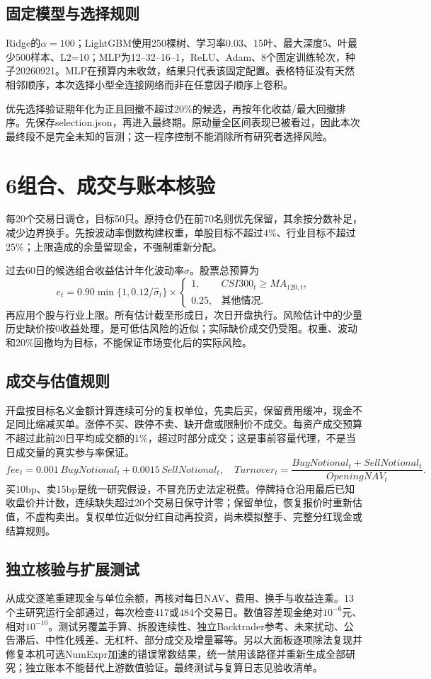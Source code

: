 \documentclass[UTF8,a4paper,10pt]{ctexart}
\newcommand{\lead}[1]{\noindent{\bfseries\color{accent}#1}\par}
\newcommand{\page}[1]{\newpage\section*{#1}}
\begin{document}
\subsection*{固定模型与选择规则}
Ridge的\(\alpha=100\)；LightGBM使用250棵树、学习率0.03、15叶、最大深度5、叶最少500样本、L2=10；MLP为12--32--16--1，ReLU、Adam、8个固定训练轮次，种子20260921。MLP在预算内未收敛，结果只代表该固定配置。表格特征没有天然相邻顺序，本次选择小型全连接网络而非在任意因子顺序上卷积。

优先选择验证期年化为正且回撤不超过20\%的候选，再按年化收益/最大回撤排序。先保存selection.json，再进入最终期。原动量全区间表现已被看过，因此本次最终段不是完全未知的盲测；这一程序控制不能消除所有研究者选择风险。

\page{6\quad 组合、成交与账本核验}
\lead{每笔费用来自实际成交金额，模型只决定分数。}
每20个交易日调仓，目标50只。原持仓仍在前70名则优先保留，其余按分数补足，减少边界换手。先按波动率倒数构建权重，单股目标不超过4\%、行业目标不超过25\%；上限造成的余量留现金，不强制重新分配。

过去60日的候选组合收益估计年化波动率\(\hat\sigma\)。股票总预算为
\[
e_t=0.90\min\{1,0.12/\hat\sigma_t\}\times
\begin{cases}1,&CSI300_t\ge MA_{120,t},\\0.25,&\text{其他情况}.\end{cases}
\]
再应用个股与行业上限。所有估计截至形成日，次日开盘执行。风险估计中的少量历史缺价按0收益处理，是可低估风险的近似；实际缺价成交仍受阻。权重、波动和20\%回撤均为目标，不能保证市场变化后的实际风险。
\subsection*{成交与估值规则}
开盘按目标名义金额计算连续可分的复权单位，先卖后买，保留费用缓冲，现金不足同比缩减买单。涨停不买、跌停不卖、缺开盘或限制价不成交。每资产成交预算不超过此前20日平均成交额的1\%，超过时部分成交；这是事前容量代理，不是当日成交量的真实参与率保证。
\[
fee_t=0.001\,BuyNotional_t+0.0015\,SellNotional_t,\quad
Turnover_t=\frac{BuyNotional_t+SellNotional_t}{OpeningNAV_t}.
\]
买10bp、卖15bp是统一研究假设，不冒充历史法定税费。停牌持仓沿用最后已知收盘价并计数，连续缺失超过20个交易日保守计零；保留单位，恢复报价时重新估值，不虚构卖出。复权单位近似分红自动再投资，尚未模拟整手、完整分红现金或结算规则。
\subsection*{独立核验与扩展测试}
从成交逐笔重建现金与单位余额，再核对每日NAV、费用、换手与收益连乘。13个主研究运行全部通过，每次检查417或484个交易日。数值容差现金绝对\(10^{-6}\)元、相对\(10^{-10}\)。测试另覆盖手算、拆股连续性、独立Backtrader参考、未来扰动、公告滞后、中性化残差、无杠杆、部分成交及增量幂等。另以大面板逐项除法复现并修复本机可选NumExpr加速的错误常数结果，统一禁用该路径并重新生成全部研究；独立账本不能替代上游数值验证。最终测试与复算日志见验收清单。
\end{document}
